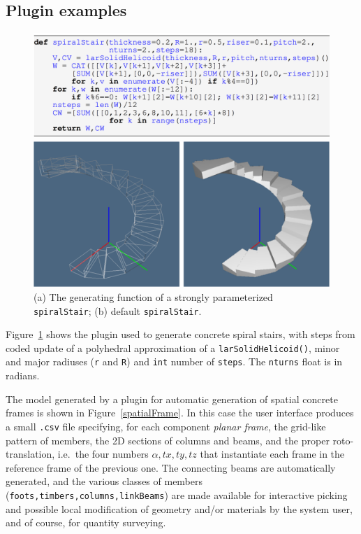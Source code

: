 \documentclass[a4paper,twoside]{article}
\begin{document}
\subsection{Plugin examples}

\begin{figure}[hbt] %
   \centering
   \includegraphics[width=\linewidth]{images/spiralstair}
   
   \includegraphics[width=\linewidth]{images/spiralstair2}
   \caption{(a) The generating function of a strongly parameterized \texttt{spiralStair}; (b) default \texttt{spiralStair}.}
   \label{spiralstair}
\end{figure}

\noindent
Figure~\ref{spiralstair} shows the plugin used to generate concrete spiral stairs, with steps from coded update of a polyhedral approximation of a \texttt{larSolidHelicoid()},  minor and major radiuses (\texttt{r} and \texttt{R}) and \texttt{int} number of \texttt{steps}. The \texttt{nturns} float is in radians. 

The model generated by a plugin for automatic generation of spatial concrete frames is shown in Figure~\ref{spatialFrame}. In this case the user interface produces a small \texttt{.csv} file specifying, for each component \emph{planar frame}, the grid-like pattern of members, the 2D sections of columns and beams, and the proper roto-translation, i.e.~the four numbers $\alpha, tx, ty, tz$ that instantiate each frame in the reference frame of the previous one. The connecting beams are automatically generated, and the various classes of members (\texttt{foots,timbers,columns,linkBeams}) are made available for interactive picking and possible local modification of geometry and/or materials by the system user, and of course, for quantity surveying.
\end{document}
